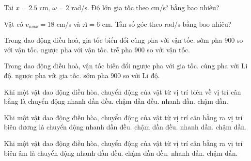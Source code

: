 \begin{ex}
Tại $x=2.5$ cm, $\omega=2$ rad/s. Độ lớn gia tốc theo cm/s² bằng bao nhiêu?
\end{ex}

\begin{ex}
Vật có $v_{max}=18$ cm/s và $A=6$ cm. Tần số góc theo rad/s bằng bao nhiêu?
\end{ex}

\begin{ex}
Trong dao động điều hoà, gia tốc biến đổi
\choice
{cùng pha với vận tốc.}
{\True sớm pha 900 so với vận tốc.}
{ngược pha với vận tốc.}
{trễ pha 900 so với vận tốc.}
\end{ex}

\begin{ex}
Trong dao động điều hoà, vận tốc biến đổi
\choice
{ngược pha với gia tốc.}
{cùng pha với Li độ.}
{ngược pha với gia tốc.}
{\True sớm pha 900 so với Li độ.}
\end{ex}

\begin{ex}
Khi một vật dao động điều hòa, chuyển động của vật từ vị trí biên về vị trí cân bằng là chuyển động
\choice
{nhanh dần đều.}
{chậm dần đều.}
{\True nhanh dần.}
{chậm dần.}
\end{ex}

\begin{ex}
Khi một vật dao động điều hòa, chuyển động của vật từ vị trí cân bằng ra vị trí biên dương là chuyển động
\choice
{nhanh dần đều.}
{chậm dần đều.}
{nhanh dần.}
{\True chậm dần.}
\end{ex}

\begin{ex}
Khi một vật dao động điều hòa, chuyển động của vật từ vị trí cân bằng ra vị trí biên âm là chuyển động
\choice
{nhanh dần đều.}
{chậm dần đều.}
{nhanh dần.}
{\True chậm dần.}
\end{ex}
